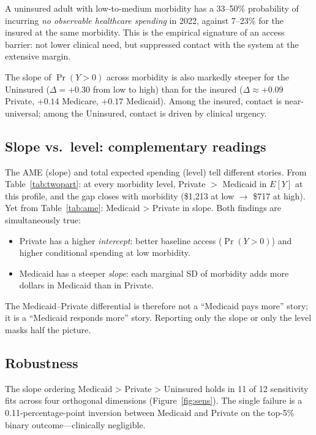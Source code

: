 \documentclass[11pt,a4paper]{article}
\begin{document}
A uninsured adult with low-to-medium morbidity has a 33--50\% probability of incurring \emph{no observable healthcare spending} in 2022, against 7--23\% for the insured at the same morbidity. This is the empirical signature of an access barrier: not lower clinical need, but suppressed contact with the system at the extensive margin.

The slope of $\Pr(Y > 0)$ across morbidity is also markedly steeper for the Uninsured ($\Delta = +0.30$ from low to high) than for the insured ($\Delta \approx +0.09$ Private, $+0.14$ Medicare, $+0.17$ Medicaid). Among the insured, contact is near-universal; among the Uninsured, contact is driven by clinical urgency.

\subsection{Slope vs.\ level: complementary readings}

The AME (slope) and total expected spending (level) tell different stories. From Table~\ref{tab:twopart}: at every morbidity level, Private $> $ Medicaid in $E[Y]$ at this profile, and the gap closes with morbidity (\$1{,}213 at low $\to$ \$717 at high). Yet from Table~\ref{tab:ame}: Medicaid > Private in slope. Both findings are simultaneously true:

\begin{itemize}
\item Private has a higher \emph{intercept}: better baseline access ($\Pr(Y > 0)$) and higher conditional spending at low morbidity.
\item Medicaid has a steeper \emph{slope}: each marginal SD of morbidity adds more dollars in Medicaid than in Private.
\end{itemize}

The Medicaid--Private differential is therefore not a ``Medicaid pays more'' story; it is a ``Medicaid responds more'' story. Reporting only the slope or only the level masks half the picture.

\subsection{Robustness}\label{sec:robust}

The slope ordering Medicaid > Private > Uninsured holds in 11 of 12 sensitivity fits across four orthogonal dimensions (Figure~\ref{fig:sens}). The single failure is a 0.11-percentage-point inversion between Medicaid and Private on the top-5\% binary outcome---clinically negligible.
\end{document}
